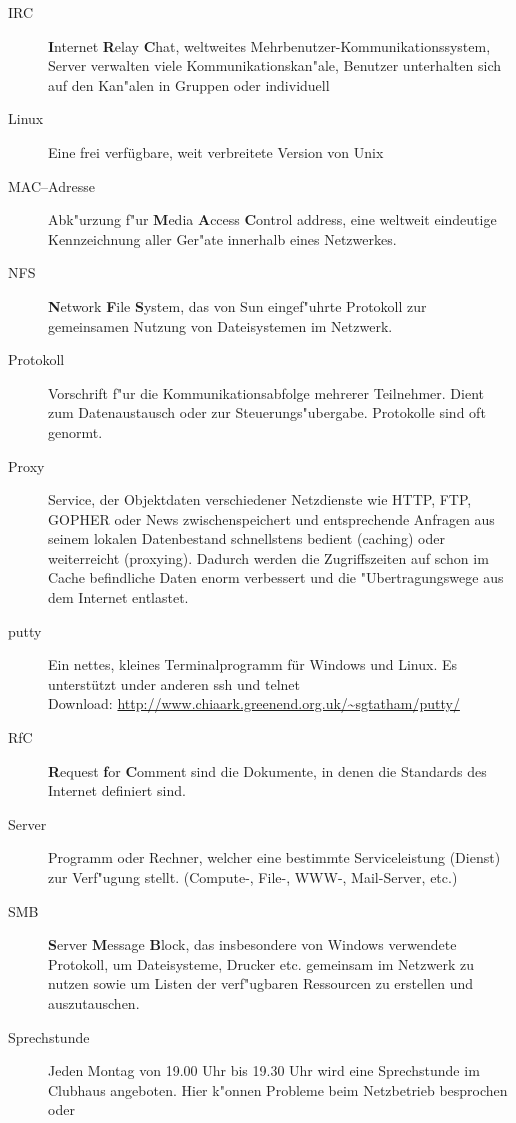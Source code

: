 \begin{description}
  \item[IRC] \textbf{I}nternet \textbf{R}elay \textbf{C}hat, weltweites
    Mehrbenutzer-Kommunikationssystem, Server verwalten viele
    Kommunikationskan"ale, Benutzer unterhalten sich auf den Kan"alen in
    Gruppen oder individuell
  \item[Linux] Eine frei verfügbare, weit verbreitete Version von \glossar Unix
  \item[MAC--Adresse] Abk"urzung f"ur \textbf{M}edia \textbf{A}ccess
    \textbf{C}ontrol address, eine weltweit eindeutige Kennzeichnung aller
    Ger"ate innerhalb eines Netzwerkes.
  \item[NFS] \textbf{N}etwork \textbf{F}ile \textbf{S}ystem, das von Sun
    eingef"uhrte Protokoll zur gemeinsamen Nutzung von Dateisystemen im
    Netzwerk.
  \item[Protokoll] Vorschrift f"ur die Kommunikationsabfolge mehrerer
    Teilnehmer. Dient zum Datenaustausch oder zur Steuerungs"ubergabe.
    Protokolle sind oft genormt.
  \item[Proxy] Service, der Objektdaten verschiedener Netzdienste wie HTTP,
    FTP, GOPHER oder News zwischenspeichert und entsprechende Anfragen aus
    seinem lokalen Datenbestand schnellstens bedient (caching) oder
    weiterreicht (proxying). Dadurch werden die Zugriffszeiten auf schon im
    Cache befindliche Daten enorm verbessert und die "Ubertragungswege aus dem
    Internet entlastet.
  \item[putty] Ein nettes, kleines Terminalprogramm für Windows und
    Linux. Es unterstützt under anderen \glossar ssh und \glossar
    telnet \\Download:   \url{http://www.chiaark.greenend.org.uk/~sgtatham/putty/}
  \item[RfC] \textbf{R}equest \textbf{f}or \textbf{C}omment sind die
    Dokumente, in denen die Standards des Internet definiert sind.
  \item[Server] Programm oder Rechner, welcher eine bestimmte Serviceleistung
    (Dienst) zur Verf"ugung stellt. (Compute-, File-, WWW-, Mail-Server, etc.)
  \item[SMB] \textbf{S}erver \textbf{M}essage \textbf{B}lock, das insbesondere
    von Windows verwendete Protokoll, um Dateisysteme, Drucker etc. gemeinsam
    im Netzwerk zu nutzen sowie um Listen der verf"ugbaren Ressourcen zu
    erstellen und auszutauschen.
  \item[Sprechstunde] Jeden Montag von 19.00 Uhr bis 19.30 Uhr
   wird eine Sprechstunde im Clubhaus
    angeboten. Hier k"onnen Probleme beim Netzbetrieb besprochen oder

\end{description}
